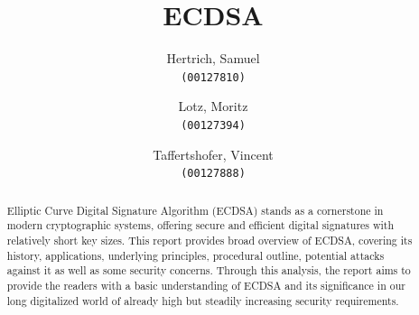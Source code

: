 \documentclass[12pt, a4paper]{article}
\title{ECDSA}
\author{
Hertrich, Samuel\\
\texttt{(00127810)}
\and
Lotz, Moritz\\
\texttt{(00127394)}
\and
Taffertshofer, Vincent\\
\texttt{(00127888)}
}
\date{}
\begin{document}
\maketitle
\thispagestyle{empty}
\clearpage
\tableofcontents
\thispagestyle{empty}
\clearpage
\setcounter{page}{1}

\begin{abstract}
Elliptic Curve Digital Signature Algorithm (ECDSA) stands as a cornerstone in modern cryptographic systems, offering secure and efficient digital signatures with relatively short key sizes. This report provides broad overview of ECDSA, covering its history, applications, underlying principles, procedural outline, potential attacks against it as well as some security concerns. Through this analysis, the report aims to provide the readers with a basic understanding of ECDSA and its significance in our long digitalized world of already high but steadily increasing security requirements.
\end{abstract}









\clearpage


\listoffigures
\end{document}
